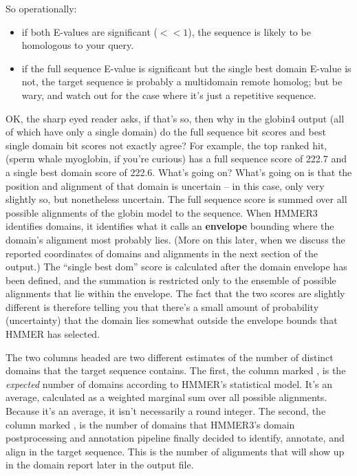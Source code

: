 So operationally:
\begin{itemize}
\item if both E-values are significant ($<<1$), the sequence is likely
      to be homologous to your query.
\item if the full sequence E-value is significant but the single best domain
      E-value is not, the target sequence is probably a multidomain remote 
      homolog; but be wary, and watch out for the case where it's just a repetitive
      sequence.
\end{itemize}

OK, the sharp eyed reader asks, if that's so, then why in the globin4
output (all of which have only a single domain) do the full sequence
bit scores and best single domain bit scores not exactly agree? For
example, the top ranked hit,  (sperm whale myoglobin,
if you're curious) has a full sequence score of 222.7 and a single
best domain score of 222.6. What's going on? What's going on is that
the position and alignment of that domain is uncertain -- in this
case, only very slightly so, but nonetheless uncertain. The full
sequence score is summed over all possible alignments of the globin
model to the  sequence. When HMMER3 identifies
domains, it identifies what it calls an \textbf{envelope} bounding
where the domain's alignment most probably lies. (More on this later,
when we discuss the reported coordinates of domains and alignments in
the next section of the output.) The ``single best dom'' score is
calculated after the domain envelope has been defined, and the
summation is restricted only to the ensemble of possible alignments
that lie within the envelope. The fact that the two scores are
slightly different is therefore telling you that there's a small
amount of probability (uncertainty) that the domain lies somewhat
outside the envelope bounds that HMMER has selected.

The two columns headed  are two different estimates of
the number of distinct domains that the target sequence contains. The
first, the column marked , is the \emph{expected} number of
domains according to HMMER's statistical model. It's an average,
calculated as a weighted marginal sum over all possible
alignments. Because it's an average, it isn't necessarily a round
integer. The second, the column marked , is the number of
domains that HMMER3's domain postprocessing and annotation pipeline
finally decided to identify, annotate, and align in the target
sequence. This is the number of alignments that will show up in the
domain report later in the output file.

